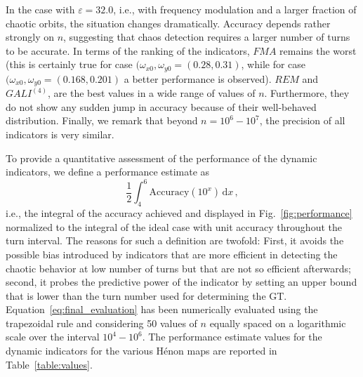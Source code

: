 In the case with $\varepsilon=32.0$, i.e., with frequency modulation and a larger fraction of chaotic orbits, the situation changes dramatically. Accuracy depends rather strongly on $n$, suggesting that chaos detection requires a larger number of turns to be accurate. In terms of the ranking of the indicators, $FMA$ remains the worst (this is certainly true for case $(\omega_{x0}, \omega_{y0}=(0.28, 0.31)$, while for case $(\omega_{x0}, \omega_{y0}=(0.168, 0.201)$ a better performance is observed). $REM$ and $GALI^{(4)}$, are the best values in a wide range of values of $n$. Furthermore, they do not show any sudden jump in accuracy because of their well-behaved distribution. Finally, we remark that beyond $n = 10^6 - 10^7$, the precision of all indicators is very similar.

To provide a quantitative assessment of the performance of the dynamic indicators, we define a performance estimate as
\begin{equation}
    \frac{1}{2}\int_4^6 \text{Accuracy}(10^x) \,\mathrm{d}x \,,
    \label{eq:final_evaluation}
\end{equation}
i.e., the integral of the accuracy achieved and displayed in Fig.~\ref{fig:performance} normalized to the integral of the ideal case with unit accuracy throughout the turn interval. The reasons for such a definition are twofold: First, it avoids the possible bias introduced by indicators that are more efficient in detecting the chaotic behavior at low number of turns but that are not so efficient afterwards; second, it probes the predictive power of the indicator by setting an upper bound that is lower than the turn number used for determining the GT. Equation~\eqref{eq:final_evaluation} has been numerically evaluated using the trapezoidal rule and considering 50 values of $n$ equally spaced on a logarithmic scale over the interval $10^4-10^6$.  The performance estimate values for the dynamic indicators for the various H\'enon maps are reported in Table~\ref{table:values}. 
